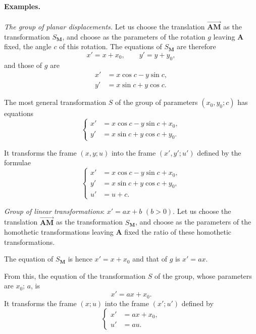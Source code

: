 \paragraph{Examples.}
\label{sec:102}
{\small
\emph{The group of planar displacements.} Let us choose the translation $\overrightarrow{\mathbf{AM}}$ as the transformation $S_{\mathbf{M}}$, and choose as the parameters of the rotation $g$ leaving $\mathbf{A}$ fixed, the angle $c$ of this rotation. The equations of $S_{\mathbf{M}}$ are therefore
\[
x'=x+x_{0},\qquad y'=y+y_{0},
\]
and those of $g$ are
\begin{align*}
  x'&=x\cos c-y\sin c,\\
  y'&=x\sin c+y\cos c.
\end{align*}

The most general transformation $S$ of the group of parameters $(x_{0},y_{0};c)$ has equations
\begin{equation}
  \label{eq:7.3}
  \left\{
    \begin{aligned}
      x'&=x\cos c-y\sin c+x_{0},\\
      y'&=x\sin c+y\cos c+y_{0}.
    \end{aligned}
  \right.
\end{equation}

It transforms the frame $(x,y;u)$ into the frame $(x',y';u')$ defined by the formulae
\begin{equation}
  \label{eq:7.4}
  \left\{
    \begin{aligned}
      x'&=x\cos c-y\sin c+x_{0},\\
      y'&=x\sin c+y\cos c+y_{0},\\
      u'&=u+c.
    \end{aligned}
  \right.
\end{equation}

\somespace

\emph{Group of linear transformations}: $x'=ax+b$ $(b>0)$. Let us choose the translation $\overrightarrow{\mathbf{AM}}$ as the transformation $S_{\mathbf{M}}$, and choose as the parameters of the homothetic transformations leaving $\mathbf{A}$ fixed the ratio of these homothetic transformations.

The equation of $S_{\mathbf{M}}$ is hence $x'=x+x_{0}$ and that of $g$ is $x'=ax$.

From this, the equation of the transformation $S$ of the group, whose parameters are $x_{0}$; $a$, is
\begin{equation}
  \label{eq:7.5}
  x'=ax+x_{0}.
\end{equation}
It transforms the frame $(x;u)$ into the frame $(x';u')$ defined by
\begin{equation}
  \label{eq:7.6}
  \left\{
    \begin{aligned}
      x'&=ax+x_{0},\\
      u'&=au.
    \end{aligned}
  \right.
\end{equation}

}
